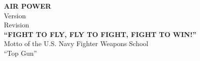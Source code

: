 \thispagestyle{empty}

\begin{minipage}{\linewidth}
\vspace{3ex}
\begin{center}
{\LARGE \textbf{AIR POWER}}\\
\vspace{3ex}
Version \thisversion\\[\smallskipamount]
Revision \thisrevision\\
\vspace{3ex}
\textbf{“FIGHT TO FLY, FLY TO FIGHT, FIGHT TO WIN!”}\\
\vspace{1ex}
Motto of the U.S. Navy Fighter Weapons School\\
\vspace{1ex}
“Top Gun”
\end{center}
\vspace{2ex}
\end{minipage}


